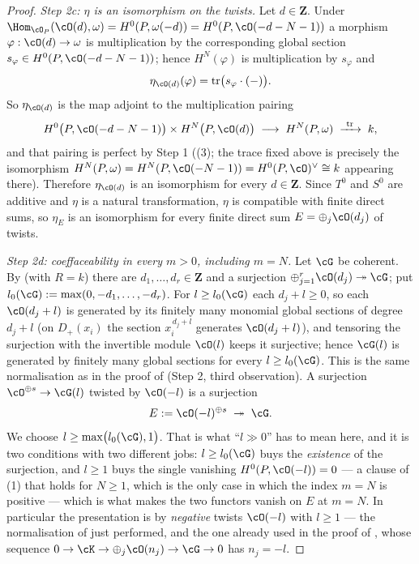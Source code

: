\begin{proof}
\emph{Step 2c: $\eta$ is an isomorphism on the twists.}  Let
$d\in\mathbf Z$.  Under
$\Hom_{\cO_P}(\cO(d),\omega)=H^0(P,\omega(-d))
=H^0(P,\cO(-d-N-1))$ a morphism $\varphi:\cO(d)\to\omega$ is
multiplication by the corresponding global section
$s_\varphi\in H^0(P,\cO(-d-N-1))$; hence $H^N(\varphi)$ is
multiplication by $s_\varphi$ and
\[
\eta_{\cO(d)}(\varphi)=\operatorname{tr}\bigl(s_\varphi\cdot(-)\bigr).
\]
So $\eta_{\cO(d)}$ is the map adjoint to the multiplication pairing
\[
H^0\bigl(P,\cO(-d-N-1)\bigr)\times H^N\bigl(P,\cO(d)\bigr)
\;\longrightarrow\;H^N(P,\omega)
\;\xrightarrow{\ \operatorname{tr}\ }\;k ,
\]
and that pairing is perfect by Step 1
((3); the trace fixed above is
precisely the isomorphism
$H^N(P,\omega)=H^N(P,\cO(-N-1))=H^0(P,\cO)^{\vee}\cong k$ appearing
there).  Therefore $\eta_{\cO(d)}$ is an isomorphism for every
$d\in\mathbf Z$.  Since $T^0$ and $S^0$ are additive and $\eta$ is a
natural transformation, $\eta$ is compatible with finite direct sums,
so $\eta_E$ is an isomorphism for every finite direct sum
$E=\oplus_j\cO(d_j)$ of twists.

\emph{Step 2d: coeffaceability in every $m>0$, including $m=N$.}  Let
$\cG$ be coherent.  By  (with
$R=k$) there are $d_1,\dots,d_r\in\mathbf Z$ and a surjection
$\oplus_{j=1}^{r}\cO(d_j)\twoheadrightarrow\cG$; put
$l_0(\cG):=\max(0,-d_1,\dots,-d_r)$.  For $l\ge l_0(\cG)$ each
$d_j+l\ge0$, so each $\cO(d_j+l)$ is generated by its finitely many
monomial global sections of degree $d_j+l$ (on $D_+(x_i)$ the section
$x_i^{\,d_j+l}$ generates $\cO(d_j+l)$), and tensoring the surjection
with the invertible module $\cO(l)$ keeps it surjective; hence $\cG(l)$
is generated by finitely many global sections for every
$l\ge l_0(\cG)$.  This is the same normalisation as in the proof of
 (Step 2, third observation).  A surjection
$\cO^{\oplus s}\to\cG(l)$ twisted by
$\cO(-l)$ is a surjection
\[
E:=\cO(-l)^{\oplus s}\;\twoheadrightarrow\;\cG .
\]
We choose $l\ge\max\bigl(l_0(\cG),1\bigr)$.  That is what
``$l\gg0$'' has to mean here, and it is two conditions with two
different jobs: $l\ge l_0(\cG)$ buys the \emph{existence} of the
surjection, and $l\ge1$ buys the single vanishing
$H^0(P,\cO(-l))=0$ --- a clause of
(1) that holds for
$N\ge1$, which is the only case in which the index $m=N$ is positive
--- which is what makes the two functors vanish on $E$ at $m=N$.  In particular the presentation is by \emph{negative}
twists $\cO(-l)$ with $l\ge1$ --- the normalisation of
 just performed, and the one
already used in the proof of , whose
sequence $0\to\cK\to\oplus_j\cO(n_j)\to\cG\to0$ has $n_j=-l$.


\end{proof}
